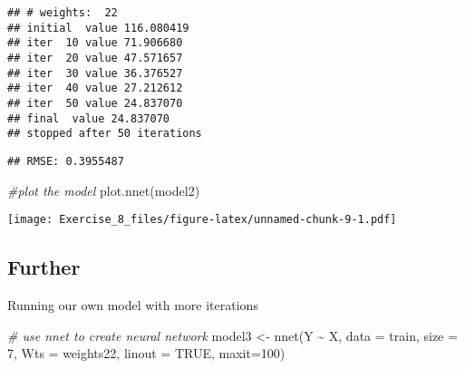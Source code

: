 \documentclass[
]{article}
\newenvironment{Shaded}{\begin{snugshade}}{\end{snugshade}}
\newcommand{\AttributeTok}[1]{\textcolor[rgb]{0.77,0.63,0.00}{#1}}
\newcommand{\CommentTok}[1]{\textcolor[rgb]{0.56,0.35,0.01}{\textit{#1}}}
\newcommand{\ConstantTok}[1]{\textcolor[rgb]{0.00,0.00,0.00}{#1}}
\newcommand{\DecValTok}[1]{\textcolor[rgb]{0.00,0.00,0.81}{#1}}
\newcommand{\FunctionTok}[1]{\textcolor[rgb]{0.00,0.00,0.00}{#1}}
\newcommand{\NormalTok}[1]{#1}
\newcommand{\OtherTok}[1]{\textcolor[rgb]{0.56,0.35,0.01}{#1}}
\newcommand{\SpecialCharTok}[1]{\textcolor[rgb]{0.00,0.00,0.00}{#1}}
\newcommand{\StringTok}[1]{\textcolor[rgb]{0.31,0.60,0.02}{#1}}
\begin{document}
\begin{verbatim}
## # weights:  22
## initial  value 116.080419 
## iter  10 value 71.906680
## iter  20 value 47.571657
## iter  30 value 36.376527
## iter  40 value 27.212612
## iter  50 value 24.837070
## final  value 24.837070 
## stopped after 50 iterations
\end{verbatim}

\begin{Shaded}
\end{Shaded}

\begin{verbatim}
## RMSE: 0.3955487
\end{verbatim}

\begin{Shaded}
\begin{Highlighting}[]
\CommentTok{\#plot the model}
\FunctionTok{plot.nnet}\NormalTok{(model2)}
\end{Highlighting}
\end{Shaded}

\texttt{[image: Exercise\_8\_files/figure-latex/unnamed-chunk-9-1.pdf]}

\hypertarget{further}{%
\subsection{Further}\label{further}}

Running our own model with more iterations

\begin{Shaded}
\begin{Highlighting}[]
\CommentTok{\# use nnet to create neural network}
\NormalTok{model3 }\OtherTok{\textless{}{-}} \FunctionTok{nnet}\NormalTok{(Y }\SpecialCharTok{\textasciitilde{}}\NormalTok{ X, }\AttributeTok{data =}\NormalTok{ train, }\AttributeTok{size =} \DecValTok{7}\NormalTok{, }\AttributeTok{Wts =}\NormalTok{ weights22, }\AttributeTok{linout =} \ConstantTok{TRUE}\NormalTok{, }\AttributeTok{maxit=}\DecValTok{100}\NormalTok{)}
\end{Highlighting}
\end{Shaded}
\end{document}
